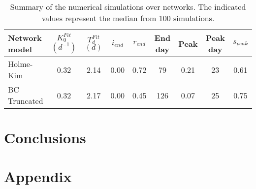 \documentclass[DIV=12, BCOR=0pt]{scrartcl}  %
\begin{document}
	\begin{table}[h!]
		\centering
		\caption{Summary of the numerical simulations over networks. The indicated values represent the median from 100 simulations.}
		\label{tab:lock_results}
		\begin{tabular}{lcccccccc}
			\toprule
			Network model & $K_0^{Fit}$ $(d^{-1})$ & $T_d^{Fit}$ $(d)$ & $i_{end}$ & $r_{end}$ & End day & Peak  & Peak day & $s_{peak}$\\
			\midrule
		 	Holme-Kim 		&    0.32 &   2.14 &  0.00 &  0.72 &  	 79 &  0.21 &   23 &	0.61\\
			BC Truncated	&    0.32 &   2.17 &  0.00 &  0.45 & 		126 &  0.07 &   25 &	0.75\\
			
			
			\bottomrule
		\end{tabular}
	\end{table}
	
	
	\section{Conclusions}

	\section*{Appendix}
		
  \footnotesize
	
\end{document}
